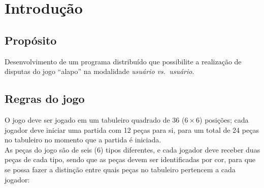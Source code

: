 \chapter{Introdução}

\section{Propósito}
Desenvolvimento de um programa distribuído que possibilite a realização de disputas do jogo
``\gls{alapo}''\cite{alapoWebsite} na modalidade
\textit{usuário vs.\ usuário}.

\section{Regras do jogo}
O jogo deve ser jogado em um tabuleiro quadrado de 36 ($6 \times 6$) posições; cada jogador deve iniciar uma partida com
12 peças para si, para um total de 24 peças no tabuleiro no momento que a partida é iniciada.\\
As peças do jogo são de seis (6) tipos diferentes, e cada jogador deve receber duas peças de cada tipo, sendo que as
peças devem ser identificadas por cor, para que se possa fazer a distinção entre quais peças no tabuleiro pertencem a
cada jogador:

